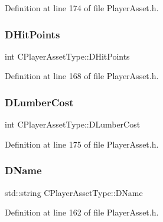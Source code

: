 Definition at line 174 of file Player\+Asset.\+h.

\hypertarget{classCPlayerAssetType_a0f10bff263838914bf347d9e9bf0af68}{}\label{classCPlayerAssetType_a0f10bff263838914bf347d9e9bf0af68} 
\subsubsection{\texorpdfstring{D\+Hit\+Points}{DHitPoints}}
{\footnotesize\ttfamily int C\+Player\+Asset\+Type\+::\+D\+Hit\+Points\hspace{0.3cm}{\ttfamily [protected]}}



Definition at line 168 of file Player\+Asset.\+h.

\hypertarget{classCPlayerAssetType_aab2aeb930d654fd5eab51be157b3439f}{}\label{classCPlayerAssetType_aab2aeb930d654fd5eab51be157b3439f} 
\subsubsection{\texorpdfstring{D\+Lumber\+Cost}{DLumberCost}}
{\footnotesize\ttfamily int C\+Player\+Asset\+Type\+::\+D\+Lumber\+Cost\hspace{0.3cm}{\ttfamily [protected]}}



Definition at line 175 of file Player\+Asset.\+h.

\hypertarget{classCPlayerAssetType_a95b557ce33af1aaecb26e8d78b0e2706}{}\label{classCPlayerAssetType_a95b557ce33af1aaecb26e8d78b0e2706} 
\subsubsection{\texorpdfstring{D\+Name}{DName}}
{\footnotesize\ttfamily std\+::string C\+Player\+Asset\+Type\+::\+D\+Name\hspace{0.3cm}{\ttfamily [protected]}}



Definition at line 162 of file Player\+Asset.\+h.

